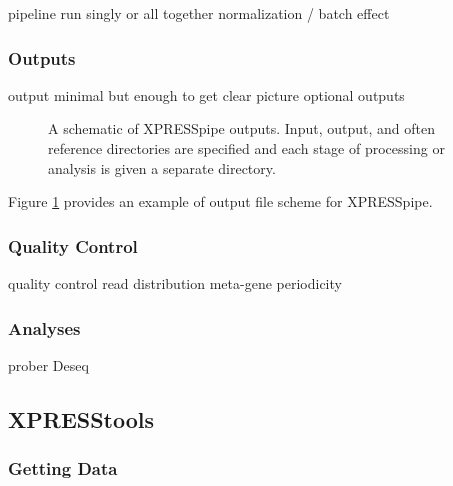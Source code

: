 \documentclass[11pt, a4paper, oneside]{article}
\begin{document}
pipeline
  run singly or all together
  normalization / batch effect

\subsubsection{Outputs}
output
  minimal but enough to get clear picture
  optional outputs

  \begin{figure}
    \caption{A schematic of XPRESSpipe outputs. Input, output, and often reference directories are specified and each stage of processing or analysis is given a separate directory.}
    \label{fig:outputs}
  \end{figure}

Figure \ref{fig:outputs} provides an example of output file scheme for XPRESSpipe.


\subsubsection{Quality Control}
quality control
  read distribution
  meta-gene
  periodicity

\subsubsection{Analyses}
prober
Deseq

\subsection{XPRESStools}

\subsubsection{Getting Data}
\end{document}
